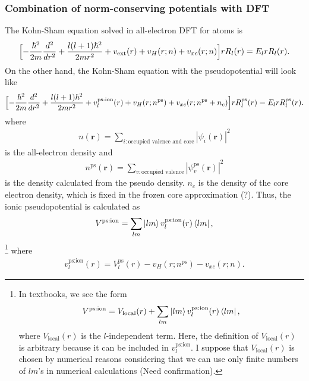 \documentclass{article}
\begin{document}
\subsubsection{Combination of norm-conserving potentials with DFT}
The Kohn-Sham equation solved in all-electron DFT for atoms is 
\begin{align}
  \Bigl[
    - \frac{\hbar^2}{2m} \frac{d^2}{dr^2} + \frac{l(l+1)\hbar^2}{2mr^2} +  v_{\text{ext}}(r) + v_H(r;n) + v_{xc}(r;n)
  \Bigr] rR_l(r) = E_l r R_l(r).
\end{align}
On the other hand, the Kohn-Sham equation with the pseudopotential will look like
\begin{align}
  \Bigl[
    - \frac{\hbar^2}{2m} \frac{d^2}{dr^2} + \frac{l(l+1)\hbar^2}{2mr^2} +  v^{\text{ps:ion}}_l(r) + v_H(r;n^{\text{ps}}) + v_{xc}(r;n^{\text{ps}} + n_c)
  \Bigr] rR^{\text{ps}}_l(r) = E_l r R^{\text{ps}}_l(r).
\end{align}
where
\begin{align}
  n(\bm{r}) = \sum_{i: \text{occupied valence and core}} |\psi_i (\bm{r}) |^2
\end{align}
is the all-electron density and 
\begin{align}
  n^{\text{ps}}(\bm{r}) = \sum_{v: \text{occupied valence}} |\psi_v^{\text{ps}} (\bm{r}) |^2
\end{align}
is the density calculated from the pseudo density.
$n_c$ is the density of the core electron density, which is fixed in the frozen core approximation (?).
Thus, the ionic pseudopotential is calculated as 
\begin{align}
  V^{\text{ps:ion}} = \sum_{lm} \ket{lm} v^{\text{ps:ion}}_l(r)  \bra{lm},
\end{align}
\footnote{In textbooks, we see the form
\begin{align}
  V^{\text{ps:ion}} = V_{\text{local}}(r) + \sum_{lm} \ket{lm} v^{\text{ps:ion}}_l(r)  \bra{lm},
\end{align}
where $V_{\text{local}}(r) $ is the $l$-independent term.
Here, the definition of $V_{\text{local}}(r)$ is arbitrary because it can be included in $v^{\text{ps:ion}}_l$.
I suppose that  $V_{\text{local}}(r)$ is chosen by numerical reasons considering that we can use only finite numbers of $lm$'s in numerical calculations (Need confirmation).
}
where 
\begin{align}
  v^{\text{ps:ion}}_{l}(r) = V^{\text{ps}}_l(r) - v_H(r;n^{\text{ps}}) - v_{xc}(r;n).
\end{align}
\end{document}
